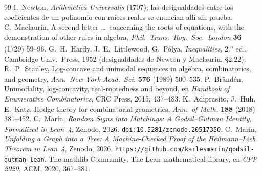 \documentclass[11pt]{article}
\begin{document}
\begin{thebibliography}{99}\small
{} I.~Newton, \emph{Arithmetica Universalis} (1707); las desigualdades entre los
coeficientes de un polinomio con ra\'ices reales se enuncian all\'i sin prueba.
 C.~Maclaurin, A second letter \dots\ concerning the roots of equations,
with the demonstration of other rules in algebra, \emph{Phil.\ Trans.\ Roy.\ Soc.\ London}
\textbf{36} (1729) 59--96.
 G.~H.~Hardy, J.~E.~Littlewood, G.~P\'olya, \emph{Inequalities}, 2.\textsuperscript{a}
ed., Cambridge Univ.\ Press, 1952 (desigualdades de Newton y Maclaurin, \S2.22).
 R.~P.~Stanley, Log-concave and unimodal sequences in algebra,
combinatorics, and geometry, \emph{Ann.\ New York Acad.\ Sci.} \textbf{576} (1989) 500--535.
 P.~Br\"and\'en, Unimodality, log-concavity, real-rootedness and beyond, en
\emph{Handbook of Enumerative Combinatorics}, CRC Press, 2015, 437--483.
 K.~Adiprasito, J.~Huh, E.~Katz, Hodge theory for combinatorial geometries,
\emph{Ann.\ of Math.} \textbf{188} (2018) 381--452.
 C.~Mar\'in, \emph{Random Signs into Matchings: A Godsil--Gutman Identity,
Formalized in Lean~4}, Zenodo, 2026. \texttt{doi:10.5281/zenodo.20517350}.
 C.~Mar\'in, \emph{Unfolding a Graph into a Tree: A Machine-Checked Proof of the
Heilmann--Lieb Theorem in Lean~4}, Zenodo, 2026.
\texttt{https://github.com/karlesmarin/godsil-gutman-lean}.
 The mathlib Community, The Lean mathematical library, en \emph{CPP 2020},
ACM, 2020, 367--381.
\end{thebibliography}
\end{document}
